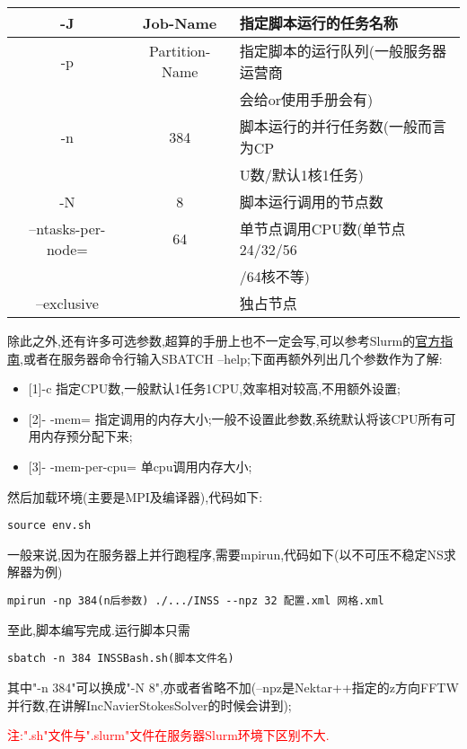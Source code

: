 \noindent
\begin{tabular}{|c|c|l|}
	\hline 
	-J & Job-Name & 指定脚本运行的任务名称 \\ 
	\hline 
	-p & Partition-Name & 指定脚本的运行队列(一般服务器运营商 \\
	   &                & 会给or使用手册会有)  \\
	\hline 
	-n & 384 & 脚本运行的并行任务数(一般而言为CP \\ 
	   &     & U数/默认1核1任务) \\
	\hline 
	-N & 8 & 脚本运行调用的节点数 \\ 
	\hline 
	--ntasks-per-node= & 64 & 单节点调用CPU数(单节点24/32/56\\ 
	                   &    & /64核不等) \\
	\hline 
	--exclusive &  & 独占节点\\ 
	\hline 
\end{tabular} 
\par
除此之外,还有许多可选参数,超算的手册上也不一定会写,可以参考Slurm的\href{https://docs.slurm.cn/}{官方指南},或者在服务器命令行输入SBATCH --help;下面再额外列出几个参数作为了解:
\begin{itemize}
	\item{[1]-c 指定CPU数,一般默认1任务1CPU,效率相对较高,不用额外设置;}
	\item{[2]- -mem= 指定调用的内存大小;一般不设置此参数,系统默认将该CPU所有可用内存预分配下来;}
	\item{[3]- -mem-per-cpu= 单cpu调用内存大小;}
\end{itemize}
\par
然后加载环境(主要是MPI及编译器),代码如下:
\begin{lstlisting}[frame=single]
source env.sh
\end{lstlisting}
\par

一般来说,因为在服务器上并行跑程序,需要mpirun,代码如下(以不可压不稳定NS求解器为例)
\begin{lstlisting}[frame=single]
mpirun -np 384(n后参数) ./.../INSS --npz 32 配置.xml 网格.xml
\end{lstlisting}
\par
至此,脚本编写完成.运行脚本只需
\begin{lstlisting}[frame=single]
sbatch -n 384 INSSBash.sh(脚本文件名)
\end{lstlisting}
\par
其中"-n 384"可以换成"-N 8",亦或者省略不加(--npz是Nektar++指定的z方向FFTW并行数,在讲解IncNavierStokesSolver的时候会讲到);\par
\textcolor{red}{注:".sh"文件与".slurm"文件在服务器Slurm环境下区别不大.}

